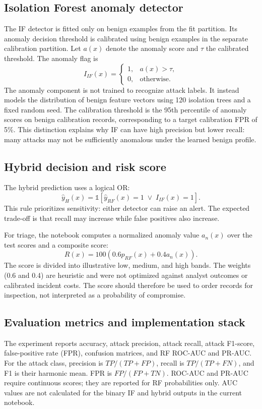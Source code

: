\documentclass[runningheads]{llncs}
\begin{document}
\subsection{Isolation Forest anomaly detector}
The IF detector is fitted only on benign examples from the fit partition. Its anomaly decision threshold is calibrated using benign examples in the separate calibration partition. Let $a(x)$ denote the anomaly score and $\tau$ the calibrated threshold. The anomaly flag is
\begin{equation}
I_{IF}(x)=\begin{cases}1,&a(x)>\tau,\\0,&\text{otherwise.}\end{cases}
\end{equation}
The anomaly component is not trained to recognize attack labels. It instead models the distribution of benign feature vectors using 120 isolation trees and a fixed random seed. The calibration threshold is the 95th percentile of anomaly scores on benign calibration records, corresponding to a target calibration FPR of 5\%. This distinction explains why IF can have high precision but lower recall: many attacks may not be sufficiently anomalous under the learned benign profile.

\subsection{Hybrid decision and risk score}
The hybrid prediction uses a logical OR:
\begin{equation}
\hat{y}_{H}(x)=\mathbb{1}[\hat{y}_{RF}(x)=1\;\lor\;I_{IF}(x)=1].
\end{equation}
This rule prioritizes sensitivity: either detector can raise an alert. The expected trade-off is that recall may increase while false positives also increase.

For triage, the notebook computes a normalized anomaly value $a_n(x)$ over the test scores and a composite score:
\begin{equation}
R(x)=100\left(0.6p_{RF}(x)+0.4a_n(x)\right).
\end{equation}
The score is divided into illustrative low, medium, and high bands. The weights (0.6 and 0.4) are heuristic and were not optimized against analyst outcomes or calibrated incident costs. The score should therefore be used to order records for inspection, not interpreted as a probability of compromise.

\subsection{Evaluation metrics and implementation stack}
The experiment reports accuracy, attack precision, attack recall, attack F1-score, false-positive rate (FPR), confusion matrices, and RF ROC-AUC and PR-AUC. For the attack class, precision is $TP/(TP+FP)$, recall is $TP/(TP+FN)$, and F1 is their harmonic mean. FPR is $FP/(FP+TN)$. ROC-AUC and PR-AUC require continuous scores; they are reported for RF probabilities only. AUC values are not calculated for the binary IF and hybrid outputs in the current notebook.
\end{document}
